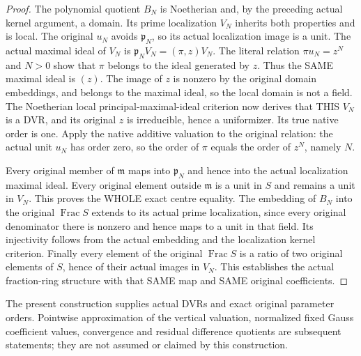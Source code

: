 \begin{proof}
The polynomial quotient $B_N$ is Noetherian and, by the preceding actual
kernel argument, a domain. Its prime localization $V_N$ inherits both
properties and is local. The original $u_N$ avoids $\mathfrak p_N$, so its
actual localization image is a unit. The actual maximal ideal of $V_N$ is
$\mathfrak p_NV_N=(\pi,z)V_N$. The literal relation $\pi u_N=z^N$ and $N>0$
show that $\pi$ belongs to the ideal generated by $z$. Thus the SAME maximal
ideal is $(z)$. The image of $z$ is nonzero by the original domain embeddings,
and belongs to the maximal ideal, so the local domain is not a field. The
Noetherian local principal-maximal-ideal criterion now derives that THIS
$V_N$ is a DVR, and its original $z$ is irreducible, hence a uniformizer.
Its true native order is one. Apply the native additive valuation to the
original relation: the actual unit $u_N$ has order zero, so the order of
$\pi$ equals the order of $z^N$, namely $N$.

Every original member of $\mathfrak m$ maps into $\mathfrak p_N$ and hence
into the actual localization maximal ideal. Every original element outside
$\mathfrak m$ is a unit in $S$ and remains a unit in $V_N$. This proves the
WHOLE exact centre equality. The embedding of $B_N$ into the original
$\operatorname{Frac}S$ extends to its actual prime localization, since every
original denominator there is nonzero and hence maps to a unit in that
field. Its injectivity follows from the actual embedding and the localization
kernel criterion. Finally every element of the original $\operatorname{Frac}S$
is a ratio of two original elements of $S$, hence of their actual images in
$V_N$. This establishes the actual fraction-ring structure with that SAME
map and SAME original coefficients.
\end{proof}

The present construction supplies actual DVRs and exact original parameter
orders. Pointwise approximation of the vertical valuation, normalized fixed
Gauss coefficient values, convergence and residual difference quotients are
subsequent statements; they are not assumed or claimed by this construction.
